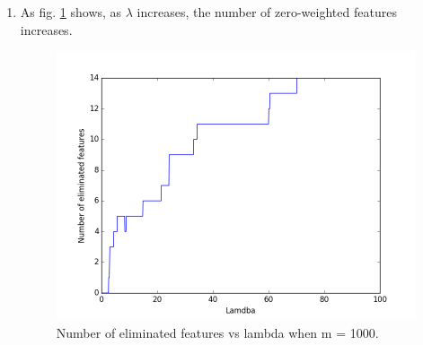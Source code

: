 \documentclass[letter, 12pt]{article}
\begin{document}
\begin{enumerate}
    	\item {}
    	\par{As fig. \ref{fig:q3-1} shows, as $ \lambda $ increases, the number of zero-weighted features increases.}
    	\begin{figure}[H]
    		\centering
    		\centering
    		\includegraphics[width=0.7\linewidth]{q3-1.png}
    		\caption{Number of eliminated features vs lambda when m = 1000.}
    		\label{fig:q3-1}
    	\end{figure}
    

\end{enumerate}
\end{document}
